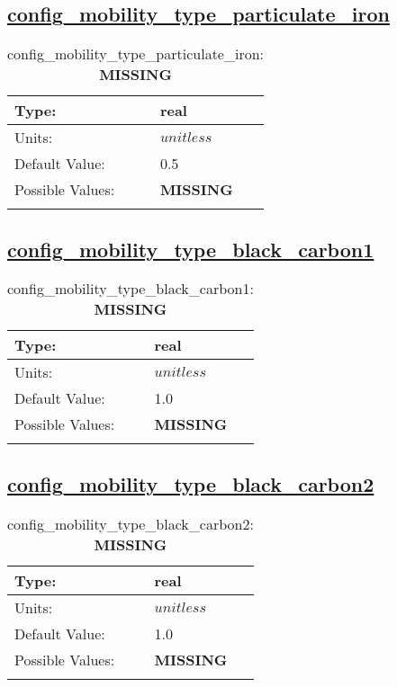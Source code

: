 \subsection[config\_mobility\_type\_particulate\_iron]{\hyperref[sec:nm_tab_biogeochemistry]{config\_mobility\_type\_particulate\_iron}}
\label{subsec:nm_sec_config_mobility_type_particulate_iron}
\begin{center}
\begin{longtable}{| p{2.0in} || p{4.0in} |}
    \hline
    Type: & real \\
    \hline
    Units: & $unitless$ \\
    \hline
    Default Value: & 0.5 \\
    \hline
    Possible Values: & {\bf \color{red} MISSING} \\
    \hline
    \caption{config\_mobility\_type\_particulate\_iron: {\bf \color{red} MISSING}}
\end{longtable}
\end{center}
\subsection[config\_mobility\_type\_black\_carbon1]{\hyperref[sec:nm_tab_biogeochemistry]{config\_mobility\_type\_black\_carbon1}}
\label{subsec:nm_sec_config_mobility_type_black_carbon1}
\begin{center}
\begin{longtable}{| p{2.0in} || p{4.0in} |}
    \hline
    Type: & real \\
    \hline
    Units: & $unitless$ \\
    \hline
    Default Value: & 1.0 \\
    \hline
    Possible Values: & {\bf \color{red} MISSING} \\
    \hline
    \caption{config\_mobility\_type\_black\_carbon1: {\bf \color{red} MISSING}}
\end{longtable}
\end{center}
\subsection[config\_mobility\_type\_black\_carbon2]{\hyperref[sec:nm_tab_biogeochemistry]{config\_mobility\_type\_black\_carbon2}}
\label{subsec:nm_sec_config_mobility_type_black_carbon2}
\begin{center}
\begin{longtable}{| p{2.0in} || p{4.0in} |}
    \hline
    Type: & real \\
    \hline
    Units: & $unitless$ \\
    \hline
    Default Value: & 1.0 \\
    \hline
    Possible Values: & {\bf \color{red} MISSING} \\
    \hline
    \caption{config\_mobility\_type\_black\_carbon2: {\bf \color{red} MISSING}}
\end{longtable}
\end{center}
